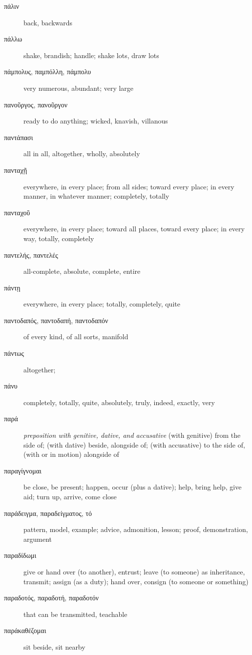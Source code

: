 \documentclass[12pt,letterpaper]{article}
\begin{document}
\begin{description}
    \item[\textgreek{πάλιν}] \marginnote{*}back, backwards
    \item[\textgreek{πάλλω}] shake, brandish; handle; shake lots, draw lots
    \item[\textgreek{πάμπολυς, παμπόλλη, πάμπολυ}] very numerous, abundant; very large
    \item[\textgreek{πανοῦργος, πανοῦργον}] ready to do anything; wicked, knavish, villanous
    \item[\textgreek{παντάπασι}] all in all, altogether, wholly, absolutely
    \item[\textgreek{πανταχῇ}] everywhere, in every place; from all sides; toward every place; in every manner, in whatever manner; completely, totally
    \item[\textgreek{πανταχοῦ}] everywhere, in every place; toward all places, toward every place; in every way, totally, completely
    \item[\textgreek{παντελής, παντελές}] all-complete, absolute, complete, entire
    \item[\textgreek{πάντῃ}] everywhere, in every place; totally, completely, quite
    \item[\textgreek{παντοδαπός, παντοδαπή, παντοδαπόν}] of every kind, of all sorts, manifold
    \item[\textgreek{πάντως}] \marginnote{*}altogether;
    \item[\textgreek{πάνυ}] \marginnote{*}completely, totally, quite, absolutely, truly, indeed, exactly, very
    \item[\textgreek{παρά}] \marginnote{*}\textit{preposition with genitive, dative, and accusative} (with genitive) from the side of; (with dative) beside, alongside of; (with accusative) to the side of, (with or in motion) alongside of
    \item[\textgreek{παραγίγνομαι}] be close, be present; happen, occur (plus a dative); help, bring help, give aid; turn up, arrive, come close
    \item[\textgreek{παράδειγμα, παραδείγματος, τό}] pattern, model, example; advice, admonition, lesson; proof, demonstration, argument
    \item[\textgreek{παραδίδωμι}] give or hand over (to another), entrust; leave (to someone) as inheritance, transmit; assign (as a duty); hand over, consign (to someone or something)
    \item[\textgreek{παραδοτός, παραδοτή, παραδοτόν}] that can be transmitted, teachable
    \item[\textgreek{παράκαθέζομαι}] sit beside, sit nearby

\end{description}
\end{document}

